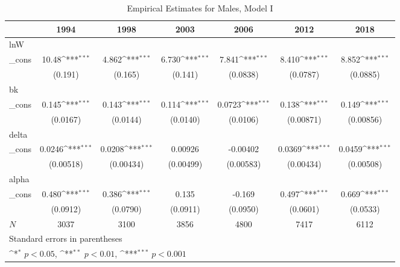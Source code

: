 \begin{table}[htbp]\centering
\def\sym#1{\ifmmode^{#1}\else\(^{#1}\)\fi}
\caption{Empirical Estimates for Males, Model I}
\begin{tabular}{l*{6}{c}}
\hline\hline
            &\multicolumn{1}{c}{1994}&\multicolumn{1}{c}{1998}&\multicolumn{1}{c}{2003}&\multicolumn{1}{c}{2006}&\multicolumn{1}{c}{2012}&\multicolumn{1}{c}{2018}\\
\hline
lnW         &                     &                     &                     &                     &                     &                     \\
\_cons      &       10.48\sym{***}&       4.862\sym{***}&       6.730\sym{***}&       7.841\sym{***}&       8.410\sym{***}&       8.852\sym{***}\\
            &     (0.191)         &     (0.165)         &     (0.141)         &    (0.0838)         &    (0.0787)         &    (0.0885)         \\
\hline
bk          &                     &                     &                     &                     &                     &                     \\
\_cons      &       0.145\sym{***}&       0.143\sym{***}&       0.114\sym{***}&      0.0723\sym{***}&       0.138\sym{***}&       0.149\sym{***}\\
            &    (0.0167)         &    (0.0144)         &    (0.0140)         &    (0.0106)         &   (0.00871)         &   (0.00856)         \\
\hline
delta       &                     &                     &                     &                     &                     &                     \\
\_cons      &      0.0246\sym{***}&      0.0208\sym{***}&     0.00926         &    -0.00402         &      0.0369\sym{***}&      0.0459\sym{***}\\
            &   (0.00518)         &   (0.00434)         &   (0.00499)         &   (0.00583)         &   (0.00434)         &   (0.00508)         \\
\hline
alpha       &                     &                     &                     &                     &                     &                     \\
\_cons      &       0.480\sym{***}&       0.386\sym{***}&       0.135         &      -0.169         &       0.497\sym{***}&       0.669\sym{***}\\
            &    (0.0912)         &    (0.0790)         &    (0.0911)         &    (0.0950)         &    (0.0601)         &    (0.0533)         \\
\hline
\(N\)       &        3037         &        3100         &        3856         &        4800         &        7417         &        6112         \\
\hline\hline
\multicolumn{7}{l}{\footnotesize Standard errors in parentheses}\\
\multicolumn{7}{l}{\footnotesize \sym{*} \(p<0.05\), \sym{**} \(p<0.01\), \sym{***} \(p<0.001\)}\\
\end{tabular}
\end{table}
